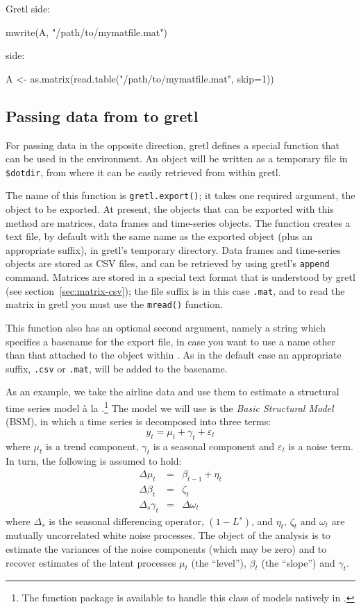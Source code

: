 Gretl side:
\begin{code}
  mwrite(A, "/path/to/mymatfile.mat")
\end{code}
 side:
\begin{code}
  A <- as.matrix(read.table("/path/to/mymatfile.mat", skip=1))
\end{code}

\subsection{Passing data from  to gretl}
\label{sec:Rpassing-data}

For passing data in the opposite direction, gretl defines a special
function that can be used in the  environment. An 
object will be written as a temporary file in
\verb|$dotdir|, from where it can be easily retrieved from within
gretl.

The name of this function is \texttt{gretl.export()}; it takes one
required argument, the object to be exported. At present, the objects
that can be exported with this method are matrices, data frames and
time-series objects. The function creates a text file, by default with
the same name as the exported object (plus an appropriate suffix),
in gretl's temporary directory. Data frames and time-series objects
are stored as CSV files, and can be retrieved by using gretl's
\texttt{append} command.  Matrices are stored in a special text format
that is understood by gretl (see section~\ref{sec:matrix-csv}); the
file suffix is in this case \texttt{.mat}, and to read the matrix in
gretl you must use the \texttt{mread()} function.

This function also has an optional second argument, namely a string
which specifies a basename for the export file, in case you want to
use a name other than that attached to the object within . As
in the default case an appropriate suffix, \texttt{.csv} or
\texttt{.mat}, will be added to the basename.

As an example, we take the airline data and use them to estimate a
structural time series model \`a la \cite{harvey89}.\footnote{The
  function package  is available to handle this
  class of models natively in .} The model we will use is
the \emph{Basic Structural Model} (BSM), in which a time series is
decomposed into three terms:
\[
  y_t = \mu_t + \gamma_t + \varepsilon_t
\]
where $\mu_t$ is a trend component, $\gamma_t$ is a seasonal component
and $\varepsilon_t$ is a noise term. In turn, the following is assumed
to hold:
\begin{eqnarray*}
  \Delta \mu_t & = & \beta_{t-1} + \eta_t \\
  \Delta \beta_t & = & \zeta_t \\
  \Delta_s \gamma_t & = & \Delta \omega_t
\end{eqnarray*}
where $\Delta_s$ is the seasonal differencing operator, $(1-L^s)$, and
$\eta_t$, $\zeta_t$ and $\omega_t$ are mutually uncorrelated white
noise processes. The object of the analysis is to estimate the
variances of the noise components (which may be zero) and to recover
estimates of the latent processes $\mu_t$ (the ``level''), $\beta_t$
(the ``slope'') and $\gamma_t$.

